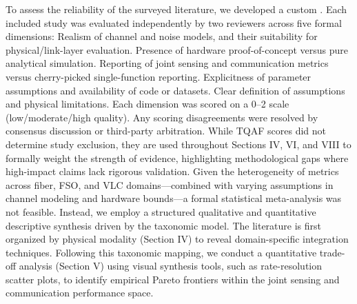 {}To assess the reliability of the surveyed literature, we developed a custom . Each included study was evaluated independently by two reviewers across five formal dimensions:\markdownRendererInterblockSeparator
{}\markdownRendererOlBeginTight
{} Realism of channel and noise models, and their suitability for physical/link-layer evaluation.\markdownRendererOlItemEnd 
{} Presence of hardware proof-of-concept versus pure analytical simulation.\markdownRendererOlItemEnd 
{} Reporting of joint sensing and communication metrics versus cherry-picked single-function reporting.\markdownRendererOlItemEnd 
{} Explicitness of parameter assumptions and availability of code or datasets.\markdownRendererOlItemEnd 
{} Clear definition of assumptions and physical limitations.\markdownRendererOlItemEnd 
\markdownRendererOlEndTight \markdownRendererInterblockSeparator
{}Each dimension was scored on a 0–2 scale (low/moderate/high quality). Any scoring disagreements were resolved by consensus discussion or third-party arbitration. While TQAF scores did not determine study exclusion, they are used throughout Sections IV, VI, and VIII to formally weight the strength of evidence, highlighting methodological gaps where high-impact claims lack rigorous validation.\markdownRendererInterblockSeparator
{}
\markdownRendererSectionEnd \markdownRendererSectionBegin
{}\markdownRendererInterblockSeparator
{}Given the heterogeneity of metrics across fiber, FSO, and VLC domains—combined with varying assumptions in channel modeling and hardware bounds—a formal statistical meta-analysis was not feasible. Instead, we employ a structured qualitative and quantitative descriptive synthesis driven by the taxonomic model. The literature is first organized by physical modality (Section IV) to reveal domain-specific integration techniques. Following this taxonomic mapping, we conduct a quantitative trade-off analysis (Section V) using visual synthesis tools, such as rate-resolution scatter plots, to identify empirical Pareto frontiers within the joint sensing and communication performance space.\markdownRendererInterblockSeparator
